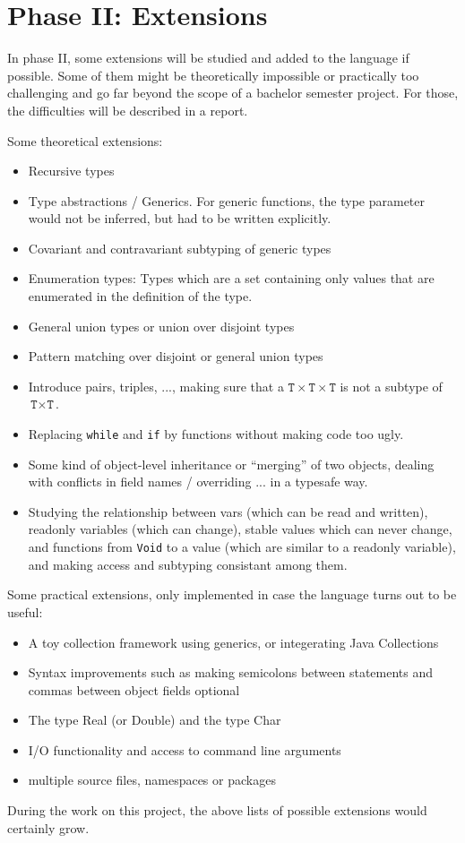 \documentclass[12pt, draft]{article}
\begin{document}
\newpage

\section{Phase II: Extensions}

In phase II, some extensions will be studied and added to the language if possible. Some of them might be theoretically impossible or practically too challenging and go far beyond the scope of a bachelor semester project. For those, the difficulties will be described in a report.

Some theoretical extensions:

\begin{itemize}
\item Recursive types
\item Type abstractions / Generics. For generic functions, the type parameter would not be inferred, but had to be written explicitly.
\item Covariant and contravariant subtyping of generic types
\item Enumeration types: Types which are a set containing only values that are enumerated in the definition of the type.
\item General union types or union over disjoint types
\item Pattern matching over disjoint or general union types
\item Introduce pairs, triples, ..., making sure that a $\texttt{T} \times \texttt{T} \times \texttt{T}$ is not a subtype of $\texttt{T} \times \texttt{T}$.
\item Replacing \texttt{while} and \texttt{if} by functions without making code too ugly.
\item Some kind of object-level inheritance or ``merging'' of two objects, dealing with conflicts in field names / overriding ... in a typesafe way.
\item Studying the relationship between vars (which can be read and written), readonly variables (which can change), stable values which can never change, and functions from \texttt{Void} to a value (which are similar to a readonly variable), and making access and subtyping consistant among them.
\end{itemize}

Some practical extensions, only implemented in case the language turns out to be useful:

\begin{itemize}
\item A toy collection framework using generics, or integerating Java Collections
\item Syntax improvements such as making semicolons between statements and commas between object fields optional
\item The type Real (or Double) and the type Char
\item I/O functionality and access to command line arguments
\item multiple source files, namespaces or packages
\end{itemize}

During the work on this project, the above lists of possible extensions would certainly grow.
\end{document}
